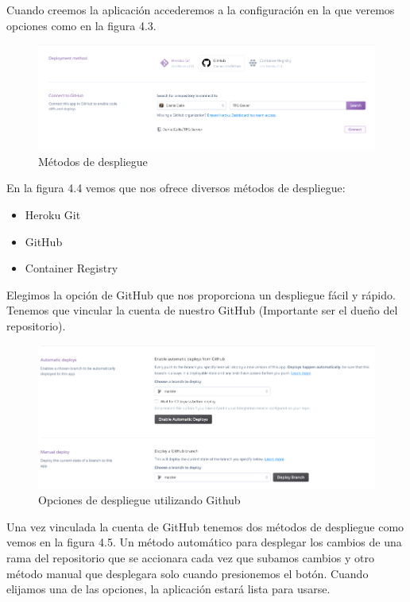 Cuando creemos la aplicación accederemos a la configuración en la que veremos opciones como en la figura 4.3.
\begin{figure}[H]
    \centering
    \includegraphics[width=6in]{figures/chapter-4/heroku_3.png}
    \caption{Métodos de despliegue}
\end{figure}
En la figura 4.4 vemos que nos ofrece diversos métodos de despliegue:
\begin{itemize}
    \item Heroku Git
    \item GitHub
    \item Container Registry
\end{itemize}
Elegimos la opción de GitHub que nos proporciona un despliegue fácil y rápido. Tenemos que vincular la cuenta de nuestro GitHub (Importante ser el dueño del repositorio).
\begin{figure}[H]
    \centering
    \includegraphics[width=6in]{figures/chapter-4/heroku_4.png}
    \caption{Opciones de despliegue utilizando Github}
\end{figure}
Una vez vinculada la cuenta de GitHub tenemos dos métodos de despliegue como vemos en la figura 4.5. Un método automático para desplegar los cambios de una rama del repositorio que se accionara cada vez que subamos cambios y otro método manual que desplegara solo cuando presionemos el botón. 
Cuando elijamos una de las opciones, la aplicación estará lista para usarse.
